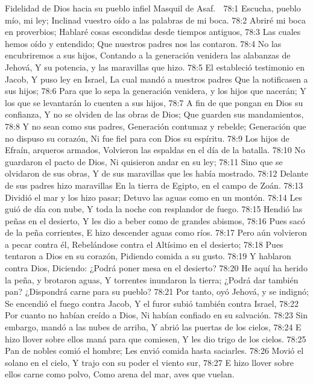 Fidelidad de Dios hacia su pueblo infiel 
Masquil de Asaf. 

78:1 Escucha, pueblo mío, mi ley; 
Inclinad vuestro oído a las palabras de mi boca. 
78:2 Abriré mi boca en proverbios; 
Hablaré cosas escondidas desde tiempos antiguos, 
78:3 Las cuales hemos oído y entendido; 
Que nuestros padres nos las contaron. 
78:4 No las encubriremos a sus hijos, 
Contando a la generación venidera las alabanzas de Jehová, 
Y su potencia, y las maravillas que hizo. 
78:5 El estableció testimonio en Jacob, 
Y puso ley en Israel, 
La cual mandó a nuestros padres 
Que la notificasen a sus hijos; 
78:6 Para que lo sepa la generación venidera, y los hijos que nacerán; 
Y los que se levantarán lo cuenten a sus hijos, 
78:7 A fin de que pongan en Dios su confianza, 
Y no se olviden de las obras de Dios; 
Que guarden sus mandamientos, 
78:8 Y no sean como sus padres, 
Generación contumaz y rebelde; 
Generación que no dispuso su corazón, 
Ni fue fiel para con Dios su espíritu. 
78:9 Los hijos de Efraín, arqueros armados, 
Volvieron las espaldas en el día de la batalla. 
78:10 No guardaron el pacto de Dios, 
Ni quisieron andar en su ley; 
78:11 Sino que se olvidaron de sus obras, 
Y de sus maravillas que les había mostrado. 
78:12 Delante de sus padres hizo maravillas 
En la tierra de Egipto, en el campo de Zoán. 
78:13 Dividió el mar y los hizo pasar; 
Detuvo las aguas como en un montón. 
78:14 Les guió de día con nube, 
Y toda la noche con resplandor de fuego. 
78:15 Hendió las peñas en el desierto, 
Y les dio a beber como de grandes abismos, 
78:16 Pues sacó de la peña corrientes, 
E hizo descender aguas como ríos. 
78:17 Pero aún volvieron a pecar contra él, 
Rebelándose contra el Altísimo en el desierto; 
78:18 Pues tentaron a Dios en su corazón, 
Pidiendo comida a su gusto. 
78:19 Y hablaron contra Dios, 
Diciendo: ¿Podrá poner mesa en el desierto? 
78:20 He aquí ha herido la peña, y brotaron aguas, 
Y torrentes inundaron la tierra; 
¿Podrá dar también pan? 
¿Dispondrá carne para su pueblo? 
78:21 Por tanto, oyó Jehová, y se indignó; 
Se encendió el fuego contra Jacob, 
Y el furor subió también contra Israel, 
78:22 Por cuanto no habían creído a Dios, 
Ni habían confiado en su salvación. 
78:23 Sin embargo, mandó a las nubes de arriba, 
Y abrió las puertas de los cielos, 
78:24 E hizo llover sobre ellos maná para que comiesen, 
Y les dio trigo de los cielos. 
78:25 Pan de nobles comió el hombre; 
Les envió comida hasta saciarles. 
78:26 Movió el solano en el cielo, 
Y trajo con su poder el viento sur, 
78:27 E hizo llover sobre ellos carne como polvo, 
Como arena del mar, aves que vuelan. 
